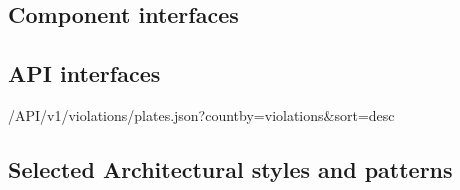 \subsection{Component interfaces}


\subsection{API interfaces}


/API/v1/violations/plates.json?countby=violations&sort=desc





\subsection{Selected Architectural styles and patterns}
 \label{cleanArchiref}

